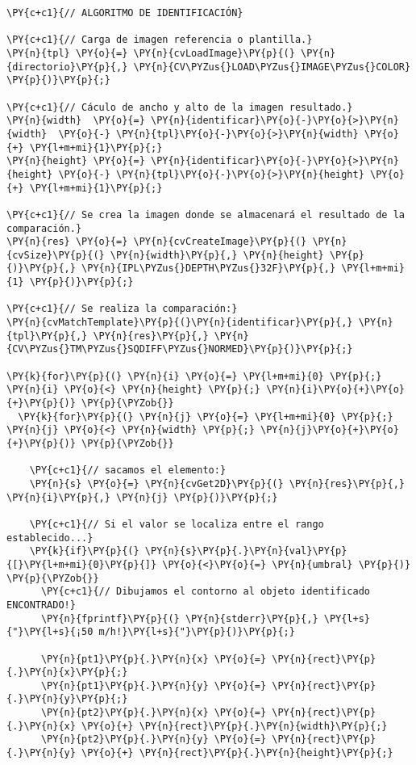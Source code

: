 \begin{Verbatim}[commandchars=\\\{\}]
\PY{c+c1}{// ALGORITMO DE IDENTIFICACIÓN}

\PY{c+c1}{// Carga de imagen referencia o plantilla.}
\PY{n}{tpl} \PY{o}{=} \PY{n}{cvLoadImage}\PY{p}{(} \PY{n}{directorio}\PY{p}{,} \PY{n}{CV\PYZus{}LOAD\PYZus{}IMAGE\PYZus{}COLOR} \PY{p}{)}\PY{p}{;}

\PY{c+c1}{// Cáculo de ancho y alto de la imagen resultado.}
\PY{n}{width}  \PY{o}{=} \PY{n}{identificar}\PY{o}{-}\PY{o}{>}\PY{n}{width}  \PY{o}{-} \PY{n}{tpl}\PY{o}{-}\PY{o}{>}\PY{n}{width} \PY{o}{+} \PY{l+m+mi}{1}\PY{p}{;}
\PY{n}{height} \PY{o}{=} \PY{n}{identificar}\PY{o}{-}\PY{o}{>}\PY{n}{height} \PY{o}{-} \PY{n}{tpl}\PY{o}{-}\PY{o}{>}\PY{n}{height} \PY{o}{+} \PY{l+m+mi}{1}\PY{p}{;}

\PY{c+c1}{// Se crea la imagen donde se almacenará el resultado de la comparación.}
\PY{n}{res} \PY{o}{=} \PY{n}{cvCreateImage}\PY{p}{(} \PY{n}{cvSize}\PY{p}{(} \PY{n}{width}\PY{p}{,} \PY{n}{height} \PY{p}{)}\PY{p}{,} \PY{n}{IPL\PYZus{}DEPTH\PYZus{}32F}\PY{p}{,} \PY{l+m+mi}{1} \PY{p}{)}\PY{p}{;}

\PY{c+c1}{// Se realiza la comparación:}
\PY{n}{cvMatchTemplate}\PY{p}{(}\PY{n}{identificar}\PY{p}{,} \PY{n}{tpl}\PY{p}{,} \PY{n}{res}\PY{p}{,} \PY{n}{CV\PYZus{}TM\PYZus{}SQDIFF\PYZus{}NORMED}\PY{p}{)}\PY{p}{;}

\PY{k}{for}\PY{p}{(} \PY{n}{i} \PY{o}{=} \PY{l+m+mi}{0} \PY{p}{;} \PY{n}{i} \PY{o}{<} \PY{n}{height} \PY{p}{;} \PY{n}{i}\PY{o}{+}\PY{o}{+}\PY{p}{)} \PY{p}{\PYZob{}}
  \PY{k}{for}\PY{p}{(} \PY{n}{j} \PY{o}{=} \PY{l+m+mi}{0} \PY{p}{;} \PY{n}{j} \PY{o}{<} \PY{n}{width} \PY{p}{;} \PY{n}{j}\PY{o}{+}\PY{o}{+}\PY{p}{)} \PY{p}{\PYZob{}}

    \PY{c+c1}{// sacamos el elemento:}
    \PY{n}{s} \PY{o}{=} \PY{n}{cvGet2D}\PY{p}{(} \PY{n}{res}\PY{p}{,} \PY{n}{i}\PY{p}{,} \PY{n}{j} \PY{p}{)}\PY{p}{;}
    
    \PY{c+c1}{// Si el valor se localiza entre el rango establecido...}
    \PY{k}{if}\PY{p}{(} \PY{n}{s}\PY{p}{.}\PY{n}{val}\PY{p}{[}\PY{l+m+mi}{0}\PY{p}{]} \PY{o}{<}\PY{o}{=} \PY{n}{umbral} \PY{p}{)} \PY{p}{\PYZob{}}
      \PY{c+c1}{// Dibujamos el contorno al objeto identificado ENCONTRADO!}
      \PY{n}{fprintf}\PY{p}{(} \PY{n}{stderr}\PY{p}{,} \PY{l+s}{"}\PY{l+s}{¡50 m/h!}\PY{l+s}{"}\PY{p}{)}\PY{p}{;}
      
      \PY{n}{pt1}\PY{p}{.}\PY{n}{x} \PY{o}{=} \PY{n}{rect}\PY{p}{.}\PY{n}{x}\PY{p}{;}
      \PY{n}{pt1}\PY{p}{.}\PY{n}{y} \PY{o}{=} \PY{n}{rect}\PY{p}{.}\PY{n}{y}\PY{p}{;}
      \PY{n}{pt2}\PY{p}{.}\PY{n}{x} \PY{o}{=} \PY{n}{rect}\PY{p}{.}\PY{n}{x} \PY{o}{+} \PY{n}{rect}\PY{p}{.}\PY{n}{width}\PY{p}{;}
      \PY{n}{pt2}\PY{p}{.}\PY{n}{y} \PY{o}{=} \PY{n}{rect}\PY{p}{.}\PY{n}{y} \PY{o}{+} \PY{n}{rect}\PY{p}{.}\PY{n}{height}\PY{p}{;}
      

\end{Verbatim}
